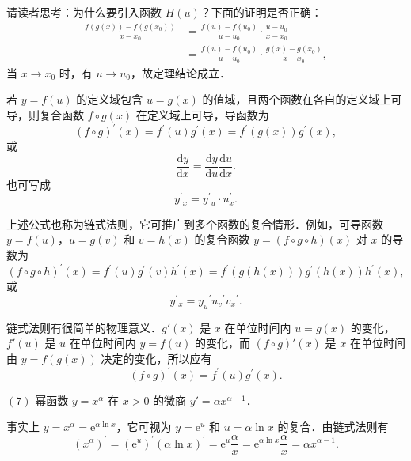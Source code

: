 请读者思考：为什么要引入函数 $H(u)$？下面的证明是否正确：
\[
\begin{aligned}
\frac{f(g(x)) - f\left(g\left(x_0\right)\right)}{x - x_0} &= \frac{f(u) - f\left(u_0\right)}{u - u_0}\cdot\frac{u - u_0}{x - x_0}\\
&= \frac{f(u) - f\left(u_0\right)}{u - u_0}\cdot\frac{g(x) - g\left(x_0\right)}{x - x_0},
\end{aligned}
\]
当 $x \to x_0$ 时，有 $u \to u_0$，故定理结论成立．

若 $y = f(u)$ 的定义域包含 $u = g(x)$ 的值域，且两个函数在各自的定义域上可导，则复合函数 $f \circ g(x)$ 在定义域上可导，导函数为
\[
\left(f\circ g\right)^{\prime}\left(x\right) = f^{\prime}\left(u\right)g^{\prime}\left(x\right) = f^{\prime}\left(g\left(x\right)\right)g^{\prime}\left(x\right),
\]
或
\[
\frac{\mathrm{d}y}{\mathrm{d}x} = \frac{\mathrm{d}y}{\mathrm{d}u}\frac{\mathrm{d}u}{\mathrm{d}x}.
\]
也可写成
\[
y^{\prime}{}_{x} = y^{\prime}{}_{u}\cdot u_{x}^{\prime}.
\]

上述公式也称为链式法则，它可推广到多个函数的复合情形．例如，可导函数 $y = f(u)$，$u = g(v)$ 和 $v = h(x)$ 的复合函数 $y = (f \circ g \circ h)(x)$ 对 $x$ 的导数为
\[
\left(f\circ g\circ h\right)^{\prime}(x) = f^{\prime}(u)g^{\prime}(v)h^{\prime}(x) = f^{\prime}(g(h(x)))g^{\prime}(h(x))h^{\prime}(x),
\]
或
\[
y^{\prime}{}_{x} = y_{u}{}^{\prime}u_{v}{}^{\prime}v_{x}{}^{\prime}.
\]

链式法则有很简单的物理意义．$g'(x)$ 是 $x$ 在单位时间内 $u = g(x)$ 的变化，$f'(u)$ 是 $u$ 在单位时间内 $y = f(u)$ 的变化，而 $(f \circ g)'(x)$ 是 $x$ 在单位时间由 $y = f(g(x))$ 决定的变化，所以应有
\[
\left(f\circ g\right)^{\prime}(x) = f^{\prime}(u)g^{\prime}(x).
\]

$(7)$ 幂函数 $y = x^{\alpha}$ 在 $x > 0$ 的微商 $y' = \alpha x^{\alpha-1}$．

事实上 $y = x^{\alpha} = \mathrm{e}^{\alpha\ln x}$，它可视为 $y = \mathrm{e}^{u}$ 和 $u = \alpha\ln x$ 的复合．由链式法则有
\[
\left(x^{\alpha}\right)^{\prime} = \left(\mathrm{e}^{u}\right)^{\prime}\left(\alpha\ln x\right)^{\prime} = \mathrm{e}^{u}\frac{\alpha}{x} = \mathrm{e}^{\alpha\ln x}\frac{\alpha}{x} = \alpha x^{\alpha-1}.
\]

